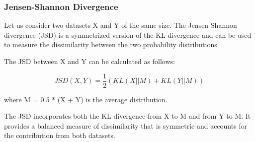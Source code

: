 




\subsubsection{Jensen-Shannon Divergence}

Let us consider two datasets X and Y of the same size. The Jensen-Shannon divergence (JSD) is a symmetrized version of the KL divergence and can be used to measure the dissimilarity between the two probability distributions.

The JSD between X and Y can be calculated as follows:

\[JSD(X, Y) = \frac{1}{2} \left( KL(X || M)
  + KL(Y || M) \right)\]

where M = 0.5 * (X + Y) is the average distribution.

The JSD incorporates both the KL divergence from X to M and from Y to M. It provides a balanced measure of dissimilarity that is symmetric and accounts for the contribution from both datasets.

